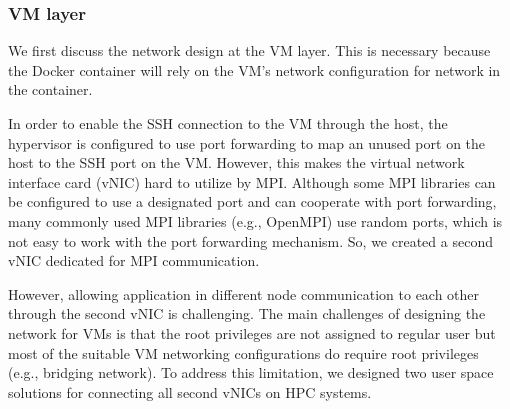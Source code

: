 \subsubsection{VM layer}
We first discuss the network design at the VM layer. This is necessary because the Docker container will rely on the VM's network configuration for network in the container. 

In order to enable the SSH connection to the VM through the host, the hypervisor is configured to use port forwarding to map an unused port on the host to the SSH port on the VM. However, this makes the virtual network interface card (vNIC) hard to utilize by MPI. Although some MPI libraries can be configured to use a designated port and can cooperate with port forwarding, many commonly used MPI libraries (e.g., OpenMPI) use random ports, which is not easy to work with the port forwarding mechanism. So, we created a second vNIC dedicated for MPI communication. 

However, allowing application in different node communication to each other through the second vNIC is challenging. The main challenges of designing the network for VMs is that the root privileges are not assigned to regular user but most of the suitable VM networking configurations do require root privileges (e.g., bridging network). To address this limitation, we designed two user space solutions for connecting all second vNICs on HPC systems.

 
